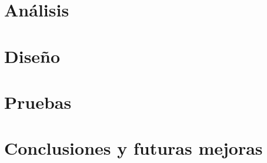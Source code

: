 \documentclass[a4paper,12pt,twoside,final]{book}
\begin{document}
\part{Análisis}



\part{Diseño}




\part{Pruebas}


\part{Conclusiones y futuras mejoras}



%

\cleardoublepage
{}


\printbibheading[heading=bibintoc]
\printbibliography

\renewcommand{\appendixpagename}{Anexos}
\renewcommand{\appendixtocname}{Anexos}
\renewcommand{\appendixname}{Anexo}
\end{document}
